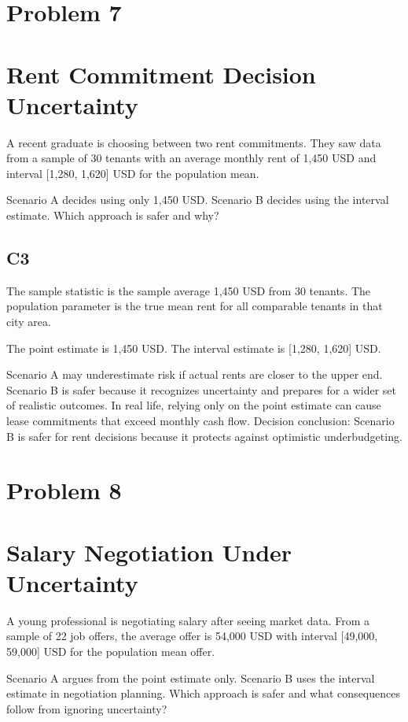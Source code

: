 \begin{ExamProblems}
		\newpage
		\item
		\section{Problem 7}
		\section{Rent Commitment Decision Uncertainty}
		A recent graduate is choosing between two rent commitments.
		They saw data from a sample of 30 tenants with an average monthly rent of 1,450 USD and interval [1,280, 1,620] USD for the population mean.

		Scenario A decides using only 1,450 USD.
		Scenario B decides using the interval estimate.
		Which approach is safer and why?

		\subsection*{C3}
		The sample statistic is the sample average 1,450 USD from 30 tenants.
		The population parameter is the true mean rent for all comparable tenants in that city area.

		The point estimate is 1,450 USD.
		The interval estimate is [1,280, 1,620] USD.

		Scenario A may underestimate risk if actual rents are closer to the upper end.
		Scenario B is safer because it recognizes uncertainty and prepares for a wider set of realistic outcomes.
		In real life, relying only on the point estimate can cause lease commitments that exceed monthly cash flow.
		Decision conclusion: Scenario B is safer for rent decisions because it protects against optimistic underbudgeting.

		\newpage
		\item
		\section{Problem 8}
		\section{Salary Negotiation Under Uncertainty}
		A young professional is negotiating salary after seeing market data.
		From a sample of 22 job offers, the average offer is 54,000 USD with interval [49,000, 59,000] USD for the population mean offer.

		Scenario A argues from the point estimate only.
		Scenario B uses the interval estimate in negotiation planning.
		Which approach is safer and what consequences follow from ignoring uncertainty?


\end{ExamProblems}
